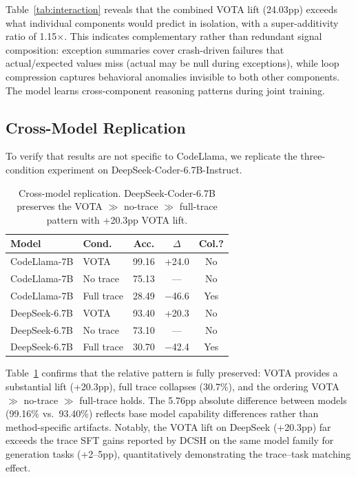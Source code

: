 \documentclass[11pt,a4paper]{article}
\begin{document}
Table~\ref{tab:interaction} reveals that the combined VOTA lift (24.03pp) exceeds what individual components would predict in isolation, with a super-additivity ratio of 1.15$\times$. This indicates complementary rather than redundant signal composition: exception summaries cover crash-driven failures that actual/expected values miss (actual may be null during exceptions), while loop compression captures behavioral anomalies invisible to both other components. The model learns cross-component reasoning patterns during joint training.

\subsection{Cross-Model Replication}

To verify that results are not specific to CodeLlama, we replicate the three-condition experiment on DeepSeek-Coder-6.7B-Instruct.

\begin{table}[t]
\centering
\small
\begin{tabular}{llccc}
\toprule
\textbf{Model} & \textbf{Cond.} & \textbf{Acc.} & \textbf{$\Delta$} & \textbf{Col.?} \\
\midrule
CodeLlama-7B & VOTA & 99.16 & +24.0 & No \\
CodeLlama-7B & No trace & 75.13 & --- & No \\
CodeLlama-7B & Full trace & 28.49 & $-$46.6 & Yes \\
\midrule
DeepSeek-6.7B & VOTA & 93.40 & +20.3 & No \\
DeepSeek-6.7B & No trace & 73.10 & --- & No \\
DeepSeek-6.7B & Full trace & 30.70 & $-$42.4 & Yes \\
\bottomrule
\end{tabular}
\caption{Cross-model replication. DeepSeek-Coder-6.7B preserves the VOTA $\gg$ no-trace $\gg$ full-trace pattern with +20.3pp VOTA lift.}
\label{tab:crossmodel}
\end{table}

Table~\ref{tab:crossmodel} confirms that the relative pattern is fully preserved: VOTA provides a substantial lift (+20.3pp), full trace collapses (30.7\%), and the ordering VOTA $\gg$ no-trace $\gg$ full-trace holds. The 5.76pp absolute difference between models (99.16\% vs.\ 93.40\%) reflects base model capability differences rather than method-specific artifacts. Notably, the VOTA lift on DeepSeek (+20.3pp) far exceeds the trace SFT gains reported by DCSH on the same model family for generation tasks (+2--5pp), quantitatively demonstrating the trace--task matching effect.
\end{document}

